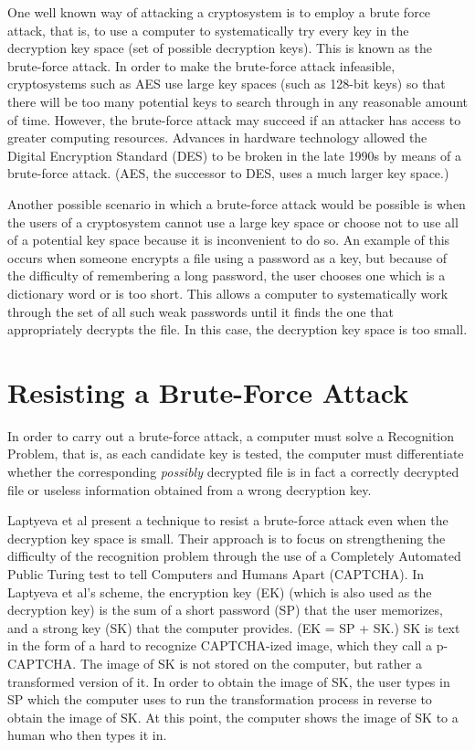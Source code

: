 \documentclass[12pt]{article}
\begin{document}
	One well known way of attacking a cryptosystem is to employ a brute force attack, that is, to use a computer to systematically try every key in the decryption key space (set of possible decryption keys). This is known as the brute-force attack. In order to make the brute-force attack infeasible, cryptosystems such as AES use large key spaces (such as 128-bit keys) so that there will be too many potential keys to search through in any reasonable amount of time. However, the brute-force attack may succeed if an attacker has access to greater computing resources. Advances in hardware technology allowed the Digital Encryption Standard (DES) to be broken in the late 1990s by means of a brute-force attack. (AES, the successor to DES, uses a much larger key space.)

	Another possible scenario in which a brute-force attack would be possible is when the users of a cryptosystem cannot use a large key space or choose not to use all of a potential key space because it is inconvenient to do so. An example of this occurs when someone encrypts a file using a password as a key, but because of the difficulty of remembering a long password, the user chooses one which is a dictionary word or is too short. This allows a computer to systematically work through the set of all such weak passwords until it finds the one that appropriately decrypts the file. In this case, the decryption key space is too small.

\section*{Resisting a Brute-Force Attack}
	In order to carry out a brute-force attack, a computer must solve a Recognition Problem, that is, as each candidate key is tested, the computer must differentiate whether the corresponding \emph{possibly} decrypted file is in fact a correctly decrypted file or useless information obtained from a wrong decryption key.

	Laptyeva et al present a technique to resist a brute-force attack even when the decryption key space is small. Their approach is to focus on strengthening the difficulty of the recognition problem through the use of a Completely Automated Public Turing test to tell Computers and Humans Apart (CAPTCHA). In Laptyeva et al's scheme, the encryption key (EK) (which is also used as the decryption key) is the sum of a short password (SP) that the user memorizes, and a strong key (SK) that the computer provides. (EK = SP + SK.) SK is text in the form of a hard to recognize CAPTCHA-ized image, which they call a p-CAPTCHA. The image of SK is not stored on the computer, but rather a transformed version of it. In order to obtain the image of SK, the user types in SP which the computer uses to run the transformation process in reverse to obtain the image of SK. At this point, the computer shows the image of SK to a human who then types it in.
\end{document}
